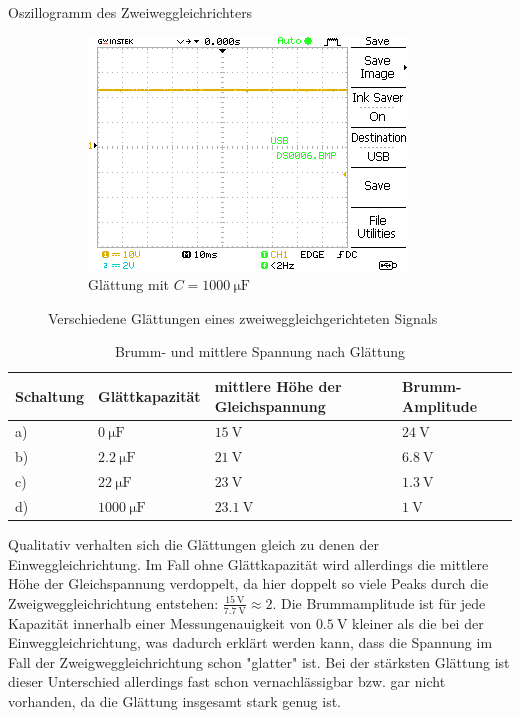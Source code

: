 \documentclass{article}
\theoremstyle{definition}
\begin{document}
\begin{aufgabe}{Oszillogramm des Zweiweggleichrichters}
\begin{figure}[H]
        \hfill
        \begin{subfigure}[b]{0.49 \textwidth}
            \includegraphics[width=\textwidth]{MesswerteVersuch2/DS0006.png}
            \caption{Glättung mit $C = \SI{1000}{\micro\farad}$}
            \label{a3_d}
        \end{subfigure}
        \caption{Verschiedene Glättungen eines zweiweggleichgerichteten Signals}
    \end{figure}
    \begin{table}[H]
        \centering
        \begin{tabular}{|l|l|l|l|}
            \hline
            Schaltung & Glättkapazität & mittlere Höhe der Gleichspannung & Brumm-Amplitude  \\
            \hline
            a) & $\SI{0}{\micro\farad}$ & $\SI{15}{\volt}$ & $\SI{24}{\volt}$ \\
            b) & $\SI{2.2}{\micro\farad}$ & $\SI{21}{\volt}$ & $\SI{6.8}{\volt}$ \\
            c) & $\SI{22}{\micro\farad}$ & $\SI{23}{\volt}$ & $\SI{1.3}{\volt}$ \\
            d) & $\SI{1000}{\micro\farad}$ & $\SI{23.1}{\volt}$ & $\SI{1}{\volt}$ \\
            \hline
        \end{tabular}
        \caption{Brumm- und mittlere Spannung nach Glättung}
    \end{table}
    \auswertung
    Qualitativ verhalten sich die Glättungen gleich zu denen der Einweggleichrichtung. Im Fall ohne Glättkapazität wird allerdings die mittlere Höhe der Gleichspannung verdoppelt, da hier doppelt so viele Peaks durch die Zweigweggleichrichtung entstehen: $\frac{\SI{15}{\volt}}{\SI{7.7}{\volt}} \approx 2$. Die Brummamplitude ist für jede Kapazität innerhalb einer Messungenauigkeit von $\SI{0.5}{\volt}$ kleiner als die bei der Einweggleichrichtung, was dadurch erklärt werden kann, dass die Spannung im Fall der Zweigweggleichrichtung schon "glatter" ist. Bei der stärksten Glättung ist dieser Unterschied allerdings fast schon vernachlässigbar bzw. gar nicht vorhanden, da die Glättung insgesamt stark genug ist. 


\end{aufgabe}
\end{document}
